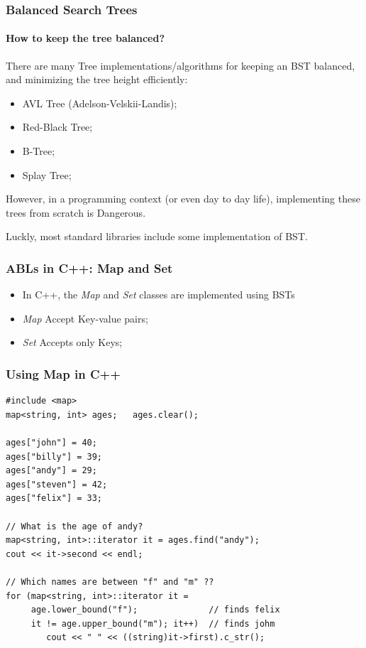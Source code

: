 \begin{frame}
  \frametitle{Balanced Search Trees}
  \framesubtitle{How to keep the tree balanced?}

  There are many Tree implementations/algorithms for keeping an BST
  balanced, and minimizing the tree height efficiently:
  \begin{itemize}
  \item AVL Tree (Adelson-Velskii-Landis);
  \item Red-Black Tree;
  \item B-Tree;
  \item Splay Tree;
  \end{itemize}
  \bigskip

  However, in a programming context (or even day to day life),
  implementing these trees from scratch is \alert{Dangerous}.

  \bigskip

  Luckly, most standard libraries include some implementation of BST.
\end{frame}

\begin{frame}
  \frametitle{ABLs in C++: Map and Set}

  \begin{itemize}
  \item In C++, the \emph{Map} and \emph{Set} classes are implemented
    using BSTs
  \item \emph{Map} Accept Key-value pairs;
  \item \emph{Set} Accepts only Keys;
  \end{itemize}

\end{frame}

\begin{frame}[fragile]
  \frametitle{Using Map in C++}
  {\small
\begin{verbatim}
#include <map>
map<string, int> ages;   ages.clear();

ages["john"] = 40;
ages["billy"] = 39;
ages["andy"] = 29;
ages["steven"] = 42;
ages["felix"] = 33;

// What is the age of andy?
map<string, int>::iterator it = ages.find("andy");
cout << it->second << endl;

// Which names are between "f" and "m" ??
for (map<string, int>::iterator it =
     age.lower_bound("f");              // finds felix
     it != age.upper_bound("m"); it++)  // finds johm
        cout << " " << ((string)it->first).c_str();
\end{verbatim}}
\end{frame}


